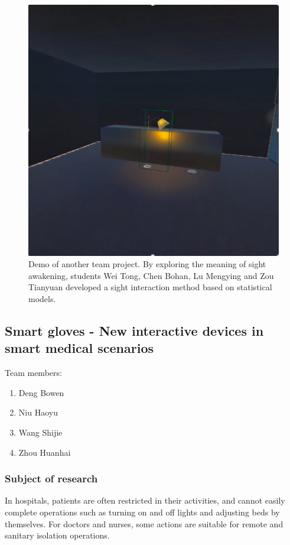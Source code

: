 \begin{figure}
  \centering
  \includegraphics[width=0.9\linewidth]{figures/Project_10.png}
  \caption{Demo of another team project. By exploring the meaning of sight awakening, students Wei Tong, Chen Bohan, Lu Mengying and Zou Tianyuan developed a sight interaction method based on statistical models. }
  \label{fig:Project10-figure}
\end{figure}

\subsection{Smart gloves - New interactive devices in smart medical scenarios}

Team members:
\begin{enumerate}
    \item Deng Bowen 
    \item Niu Haoyu
    \item Wang Shijie 
    \item Zhou Huanhai 
\end{enumerate}


\subsubsection{Subject of research}

In hospitals, patients are often restricted in their activities, and cannot easily complete operations such as turning on and off lights and adjusting beds by themselves. For doctors and nurses, some actions are suitable for remote and sanitary isolation operations.


